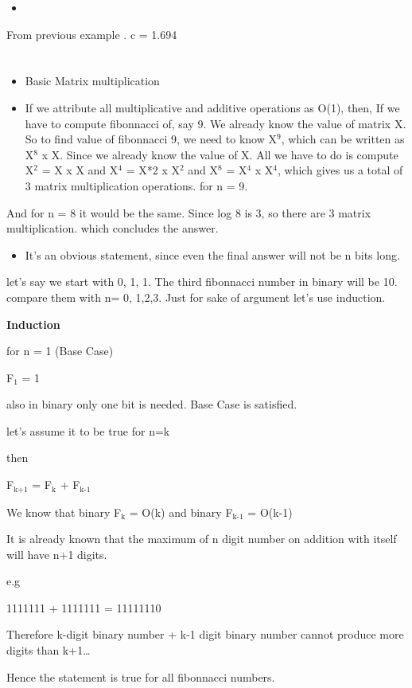 \documentclass{book}
\begin{document}
\begin{itemize}
\item 
\end{itemize}
From previous example . c = 1.694

\section{}
\label{sec:org02b0c0b}
\begin{itemize}
\item Basic Matrix multiplication
\item If we attribute all multiplicative and additive operations as O(1), then,
If we have to compute fibonnacci of, say 9.
We already know the value of matrix X. So to find value of fibonnacci 9, we need to know X\(^{\text{9}}\), which can be written as X\(^{\text{8}}\) x X. Since we already know the value of X. All we have to do is compute X\(^{\text{2}}\) = X x X and X\(^{\text{4}}\) = X*2 x X\(^{\text{2}}\) and X\(^{\text{8}}\) = X\(^{\text{4}}\) x X\(^{\text{4}}\), which gives us a total of 3 matrix multiplication operations. for n = 9.
\end{itemize}
And for n = 8 it would be the same. Since log 8 is 3, so there are 3 matrix multiplication. which concludes the answer.
\begin{itemize}
\item It's an obvious statement, since even the final answer will not be n bits long.
\end{itemize}
let's say we start with 0, 1, 1. The third fibonnacci number in binary will be 10.  compare them with n= 0, 1,2,3. Just for sake of argument let's use induction.
\begin{EQUATION}
\textbf{Induction}

for n = 1 (Base Case)

F\(_{\text{1}}\) = 1

also in binary only one bit is needed. Base Case is satisfied.

let's assume it to be true for n=k

then 

F\(_{\text{k+1}}\) = F\(_{\text{k}}\) + F\(_{\text{k-1}}\)

We know that binary F\(_{\text{k}}\) = O(k) and binary F\(_{\text{k-1}}\) = O(k-1)

It is already known that the maximum of n digit number on addition with itself will have n+1 digits.

e.g

1111111 + 1111111 = 11111110

Therefore k-digit binary number + k-1 digit binary number cannot produce more digits than k+1\ldots{}

Hence the statement is true for all fibonnacci numbers.
\end{EQUATION}
\end{document}
